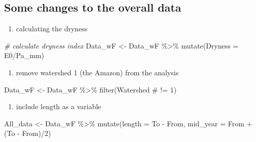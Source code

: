 \documentclass[]{elsarticle} %
\newenvironment{Shaded}{\begin{snugshade}}{\end{snugshade}}
\newcommand{\AttributeTok}[1]{\textcolor[rgb]{0.77,0.63,0.00}{#1}}
\newcommand{\CommentTok}[1]{\textcolor[rgb]{0.56,0.35,0.01}{\textit{#1}}}
\newcommand{\DecValTok}[1]{\textcolor[rgb]{0.00,0.00,0.81}{#1}}
\newcommand{\FunctionTok}[1]{\textcolor[rgb]{0.00,0.00,0.00}{#1}}
\newcommand{\NormalTok}[1]{#1}
\newcommand{\OtherTok}[1]{\textcolor[rgb]{0.56,0.35,0.01}{#1}}
\newcommand{\SpecialCharTok}[1]{\textcolor[rgb]{0.00,0.00,0.00}{#1}}
\newcommand{\StringTok}[1]{\textcolor[rgb]{0.31,0.60,0.02}{#1}}
\providecommand{\tightlist}{%
  \setlength{\itemsep}{0pt}\setlength{\parskip}{0pt}}
\begin{document}
\hypertarget{some-changes-to-the-overall-data}{%
\subsection{Some changes to the overall data}\label{some-changes-to-the-overall-data}}

\begin{enumerate}
\def\labelenumi{\arabic{enumi}.}
\tightlist
\item
  calculating the dryness
\end{enumerate}

\begin{Shaded}
\begin{Highlighting}[]
\CommentTok{\# calculate dryness index}
\NormalTok{Data\_wF }\OtherTok{\textless{}{-}}\NormalTok{ Data\_wF }\SpecialCharTok{\%\textgreater{}\%}
  \FunctionTok{mutate}\NormalTok{(}\AttributeTok{Dryness =}\NormalTok{ E0}\SpecialCharTok{/}\NormalTok{Pa\_mm)}
\end{Highlighting}
\end{Shaded}

\begin{enumerate}
\def\labelenumi{\arabic{enumi}.}
\setcounter{enumi}{1}
\tightlist
\item
  remove watershed 1 (the Amazon) from the analysis
\end{enumerate}

\begin{Shaded}
\begin{Highlighting}[]
\NormalTok{Data\_wF }\OtherTok{\textless{}{-}}\NormalTok{ Data\_wF }\SpecialCharTok{\%\textgreater{}\%}
  \FunctionTok{filter}\NormalTok{(}\StringTok{\textasciigrave{}}\AttributeTok{Watershed \#}\StringTok{\textasciigrave{}} \SpecialCharTok{!=} \DecValTok{1}\NormalTok{)}
\end{Highlighting}
\end{Shaded}

\begin{enumerate}
\def\labelenumi{\arabic{enumi}.}
\setcounter{enumi}{2}
\tightlist
\item
  include length as a variable
\end{enumerate}

\begin{Shaded}
\begin{Highlighting}[]
\NormalTok{All\_data }\OtherTok{\textless{}{-}}\NormalTok{ Data\_wF }\SpecialCharTok{\%\textgreater{}\%}
  \FunctionTok{mutate}\NormalTok{(}\AttributeTok{length =}\NormalTok{ To }\SpecialCharTok{{-}}\NormalTok{ From,}
         \AttributeTok{mid\_year =}\NormalTok{ From }\SpecialCharTok{+}\NormalTok{ (To }\SpecialCharTok{{-}}\NormalTok{ From)}\SpecialCharTok{/}\DecValTok{2}\NormalTok{)}
\end{Highlighting}
\end{Shaded}
\end{document}
